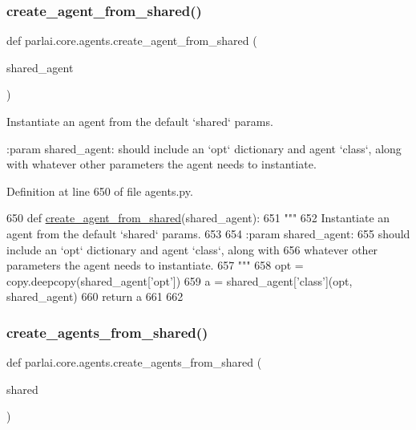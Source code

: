 \subsubsection{\texorpdfstring{create\+\_\+agent\+\_\+from\+\_\+shared()}{create\_agent\_from\_shared()}}
{\footnotesize\ttfamily def parlai.\+core.\+agents.\+create\+\_\+agent\+\_\+from\+\_\+shared (\begin{DoxyParamCaption}\item[{}]{shared\+\_\+agent }\end{DoxyParamCaption})}

\begin{DoxyVerb}Instantiate an agent from the default `shared` params.

:param shared_agent:
    should include an `opt` dictionary and agent `class`, along with
    whatever other parameters the agent needs to instantiate.
\end{DoxyVerb}
 

Definition at line 650 of file agents.\+py.


\begin{DoxyCode}
650 \textcolor{keyword}{def }\hyperlink{namespaceparlai_1_1core_1_1agents_aa5af5dd1d2f9da491b60348d479b849f}{create\_agent\_from\_shared}(shared\_agent):
651     \textcolor{stringliteral}{"""}
652 \textcolor{stringliteral}{    Instantiate an agent from the default `shared` params.}
653 \textcolor{stringliteral}{}
654 \textcolor{stringliteral}{    :param shared\_agent:}
655 \textcolor{stringliteral}{        should include an `opt` dictionary and agent `class`, along with}
656 \textcolor{stringliteral}{        whatever other parameters the agent needs to instantiate.}
657 \textcolor{stringliteral}{    """}
658     opt = copy.deepcopy(shared\_agent[\textcolor{stringliteral}{'opt'}])
659     a = shared\_agent[\textcolor{stringliteral}{'class'}](opt, shared\_agent)
660     \textcolor{keywordflow}{return} a
661 
662 
\end{DoxyCode}
\mbox{\label{namespaceparlai_1_1core_1_1agents_a5600530545f5e60a79e2d657b5af1d8c}} 
\subsubsection{\texorpdfstring{create\+\_\+agents\+\_\+from\+\_\+shared()}{create\_agents\_from\_shared()}}
{\footnotesize\ttfamily def parlai.\+core.\+agents.\+create\+\_\+agents\+\_\+from\+\_\+shared (\begin{DoxyParamCaption}\item[{}]{shared }\end{DoxyParamCaption})}

